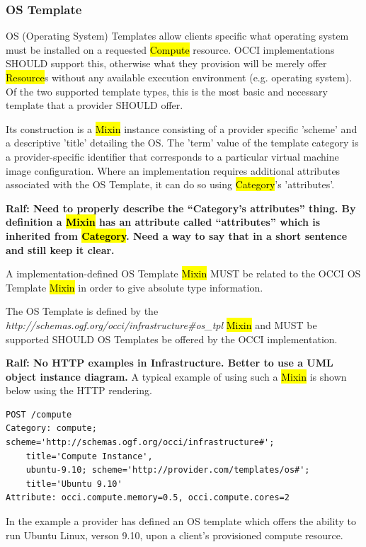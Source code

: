 \documentclass[10pt,a4paper]{article}
\begin{document}
\subsubsection{OS Template}
OS (Operating System) Templates allow clients specific what operating system must be installed on a
requested \hl{Compute} resource. OCCI implementations SHOULD support this, otherwise what they 
provision will be merely offer \hl{Resource}s without any available execution environment 
(e.g. operating system). Of the two supported template types, this is the most basic 
and necessary template that a provider SHOULD offer. 

Its construction is a \hl{Mixin} instance consisting of a provider specific 'scheme' and a descriptive 'title' 
detailing the OS. The 'term' value of the template category is a provider-specific identifier that 
corresponds to a particular virtual machine image configuration. Where an implementation requires 
additional attributes associated with the OS Template, it can do so using \hl{Category}'s 'attributes'.

{\bf Ralf: Need to properly describe the ``Category's attributes'' thing. By definition a \hl{Mixin} has an
attribute called ``attributes'' which is inherited from \hl{Category}. Need a way to say that in a short
sentence and still keep it clear.}

A implementation-defined OS Template \hl{Mixin} MUST be related to 
the OCCI OS Template \hl{Mixin} in order to give absolute type information. 

The OS Template 
is defined by the \textit{http://schemas.ogf.org/occi/infrastructure\#os\_tpl} \hl{Mixin} and
MUST be supported SHOULD OS Templates be offered by the OCCI implementation.

{\bf Ralf: No HTTP examples in Infrastructure. Better to use a UML object instance diagram.}
A typical example of using such a \hl{Mixin} is shown below using the HTTP rendering.

\begin{verbatim}
POST /compute
Category: compute; scheme='http://schemas.ogf.org/occi/infrastructure#'; 
    title='Compute Instance', 
    ubuntu-9.10; scheme='http://provider.com/templates/os#'; 
    title='Ubuntu 9.10'
Attribute: occi.compute.memory=0.5, occi.compute.cores=2
\end{verbatim}
In the example a provider has defined an OS template which offers the ability to run Ubuntu Linux,
verson 9.10, upon a client's provisioned compute resource.
\end{document}
